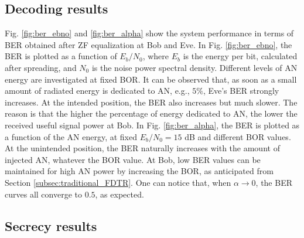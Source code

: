 \documentclass[a4paper,11pt]{article}
\begin{document}
\subsection{Decoding results}
Fig. \ref{fig:ber_ebno} and \ref{fig:ber_alpha} show the system performance in terms of BER obtained after ZF equalization at Bob and Eve. In Fig. \ref{fig:ber_ebno}, the BER is plotted as a function of $E_b/N_0$, where $E_b$ is the energy per bit, calculated after spreading, and $N_0$ is the noise power spectral density.  Different levels of AN energy are investigated at fixed BOR. It can be observed that, as soon as a small amount of radiated energy is dedicated to AN, e.g., $5\%$, Eve's BER strongly increases. At the intended position, the BER also increases but much slower. The reason is that the higher the percentage of energy dedicated to AN, the lower the received useful signal power at Bob. In Fig. \ref{fig:ber_alpha}, the BER is plotted as a function of the AN energy, at fixed $E_b/N_0=15$ dB and different BOR values. At the unintended position, the BER naturally increases with the amount of injected AN, whatever the BOR value. At Bob, low BER values can be maintained for high AN power by increasing the BOR, as anticipated from Section \ref{subsec:traditional_FDTR}. One can notice that, when $\alpha \to 0$, the BER curves all converge to $0.5$, as expected.




\subsection{Secrecy results}
\end{document}
